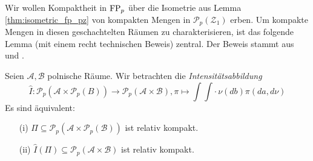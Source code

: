 Wir wollen Kompaktheit in $\operatorname{FP}_p$ über die Isometrie aus Lemma \ref{thm:isometric_fp_pz} von kompakten Mengen in $\mathcal{P}_p(\mathcal{Z}_1)$ erben. Um kompakte Mengen in diesen geschachtelten Räumen zu charakterisieren, ist das folgende Lemma (mit einem recht technischen Beweis) zentral. Der Beweis stammt aus \cite[Lemma 2.6]{Backhoff-Veraguas2019} und \cite[S. 178, Proposition 2.2]{SznitmanAlain-Sol2006Tipo}.
\begin{lemma}\label{thm:intensity_compactness}
    Seien $\mathcal{A,B}$ polnische Räume. Wir betrachten die \emph{Intensitätsabbildung} 
    $$\hat{I}: \mathcal{P}_p(\mathcal{A} \times \mathcal{P}_p(B))\rightarrow \mathcal{P}_p(\mathcal{A}\times\mathcal{B}), \pi \mapsto \int \int \cdot \,\nu(db) \pi(da, d\nu)$$
    Es sind äquivalent:
    \begin{enumerate}
        \item[(i)] $\Pi \subseteq \mathcal{P}_p(\mathcal{A}\times \mathcal{P}_p(\mathcal{B}))$ ist relativ kompakt.
        \item[(ii)] $\hat{I}(\Pi) \subseteq \mathcal{P}_p(\mathcal{A} \times \mathcal{B})$ ist relativ kompakt.
    \end{enumerate}
\end{lemma}
